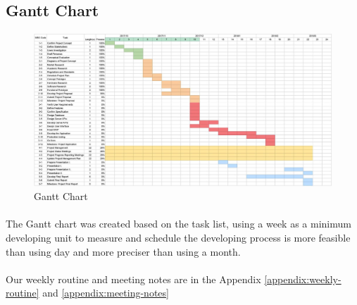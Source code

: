 \documentclass[12pt,a4paper]{article}
\begin{document}
        \begin{table}[H]
          \caption{Milestones} 
        \end{table} 

      \subsection{Gantt Chart}
        \begin{figure}[H]
          \centering
          \includegraphics[width=1\textwidth]{../assets/9-gantt-chart.jpg}
          \caption{Gantt Chart}
          \label{fig:Gantt Chart}
        \end{figure}
        \paragraph{}
          The Gantt chart was created based on the task list, using a week as a minimum developing unit to measure and schedule the developing process is more feasible than using day and more preciser than using a month.
        \paragraph{}
          Our weekly routine and meeting notes are in the Appendix \ref{appendix:weekly-routine} and \ref{appendix:meeting-notes}
      
\end{document}

